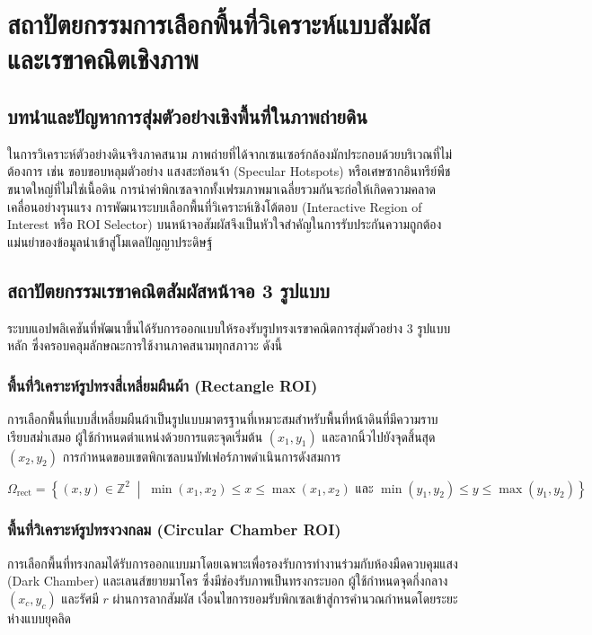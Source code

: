 \chapter{สถาปัตยกรรมการเลือกพื้นที่วิเคราะห์แบบสัมผัสและเรขาคณิตเชิงภาพ}
\label{ch:interactive_roi}

\section{บทนำและปัญหาการสุ่มตัวอย่างเชิงพื้นที่ในภาพถ่ายดิน}

ในการวิเคราะห์ตัวอย่างดินจริงภาคสนาม ภาพถ่ายที่ได้จากเซนเซอร์กล้องมักประกอบด้วยบริเวณที่ไม่ต้องการ เช่น ขอบขอบหลุมตัวอย่าง แสงสะท้อนจ้า (Specular Hotspots) หรือเศษซากอินทรีย์พืชขนาดใหญ่ที่ไม่ใช่เนื้อดิน การนำค่าพิกเซลจากทั้งเฟรมภาพมาเฉลี่ยรวมกันจะก่อให้เกิดความคลาดเคลื่อนอย่างรุนแรง การพัฒนาระบบเลือกพื้นที่วิเคราะห์เชิงโต้ตอบ (Interactive Region of Interest หรือ ROI Selector) บนหน้าจอสัมผัสจึงเป็นหัวใจสำคัญในการรับประกันความถูกต้องแม่นยำของข้อมูลนำเข้าสู่โมเดลปัญญาประดิษฐ์

\section{สถาปัตยกรรมเรขาคณิตสัมผัสหน้าจอ 3 รูปแบบ}

ระบบแอปพลิเคชันที่พัฒนาขึ้นได้รับการออกแบบให้รองรับรูปทรงเรขาคณิตการสุ่มตัวอย่าง 3 รูปแบบหลัก ซึ่งครอบคลุมลักษณะการใช้งานภาคสนามทุกสภาวะ ดังนี้

\subsection{พื้นที่วิเคราะห์รูปทรงสี่เหลี่ยมผืนผ้า (Rectangle ROI)}
การเลือกพื้นที่แบบสี่เหลี่ยมผืนผ้าเป็นรูปแบบมาตรฐานที่เหมาะสมสำหรับพื้นที่หน้าดินที่มีความราบเรียบสม่ำเสมอ ผู้ใช้กำหนดตำแหน่งด้วยการแตะจุดเริ่มต้น $(x_1, y_1)$ และลากนิ้วไปยังจุดสิ้นสุด $(x_2, y_2)$ การกำหนดขอบเขตพิกเซลบนบัฟเฟอร์ภาพดำเนินการดังสมการ

\begin{equation}
\Omega_{\text{rect}} = \left\{ (x, y) \in \mathbb{Z}^2 \;\middle|\; \min(x_1, x_2) \le x \le \max(x_1, x_2) \text{ และ } \min(y_1, y_2) \le y \le \max(y_1, y_2) \right\}
\end{equation}

\subsection{พื้นที่วิเคราะห์รูปทรงวงกลม (Circular Chamber ROI)}
การเลือกพื้นที่ทรงกลมได้รับการออกแบบมาโดยเฉพาะเพื่อรองรับการทำงานร่วมกับห้องมืดควบคุมแสง (Dark Chamber) และเลนส์ขยายมาโคร ซึ่งมีช่องรับภาพเป็นทรงกระบอก ผู้ใช้กำหนดจุดกึ่งกลาง $(x_c, y_c)$ และรัศมี $r$ ผ่านการลากสัมผัส เงื่อนไขการยอมรับพิกเซลเข้าสู่การคำนวณกำหนดโดยระยะห่างแบบยุคลิด

